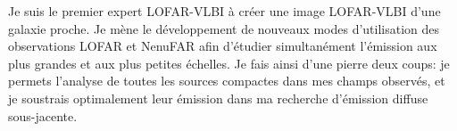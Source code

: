 %
%	

\begin{tcolorbox}[colback=green!10, colframe=green!50!black, arc=3mm, boxrule=1pt]
	Je suis le premier expert LOFAR-VLBI \`a cr\'eer une image LOFAR-VLBI d'une galaxie proche. Je m\`ene le d\'eveloppement de nouveaux modes d'utilisation des observations LOFAR et NenuFAR afin d'\'etudier simultan\'ement l'\'emission aux plus grandes et aux plus petites \'echelles. Je fais ainsi d'une pierre deux coups: je permets l'analyse de toutes les sources compactes dans mes champs observ\'es, et je soustrais optimalement leur \'emission dans ma recherche d'\'emission diffuse sous-jacente.
\end{tcolorbox}
